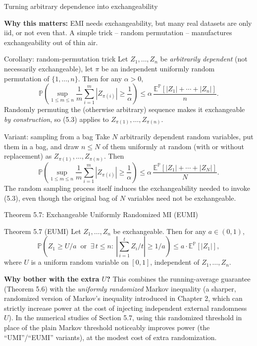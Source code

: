 \documentclass[aspectratio=169,10pt]{beamer}
\renewcommand{\P}{\mathbb{P}}
\newcommand{\E}{\mathbb{E}}
\begin{document}
\begin{frame}[allowframebreaks]{Turning arbitrary dependence into exchangeability}

  \textbf{Why this matters:} EMI needs exchangeability, but many
  real datasets are only iid, or not even that. A simple trick --
  random permutation -- manufactures exchangeability out of thin air.

  \begin{block}{Corollary: random-permutation trick}
    Let $Z_1,\ldots,Z_n$ be \emph{arbitrarily dependent} (not
    necessarily exchangeable), let $\pi$ be an independent uniformly
    random permutation of $\{1,\ldots,n\}$. Then for any $\alpha>0$,
    $$ \P\left(\sup_{1\le m\le n} \frac1m \sum_{i=1}^m |Z_{\pi(i)}| \ge \frac1\alpha\right)
       \le \alpha\, \frac{\E^\P[|Z_1|+\cdots+|Z_n|]}{n}. $$
    Randomly permuting the (otherwise arbitrary) sequence makes it
    exchangeable \emph{by construction}, so (5.3) applies to
    $Z_{\pi(1)},\ldots,Z_{\pi(n)}$.
  \end{block}

  \begin{block}{Variant: sampling from a bag}
    Take $N$ arbitrarily dependent random variables, put them in a
    bag, and draw $n \le N$ of them uniformly at random (with or
    without replacement) as $Z_{\pi(1)}, \ldots, Z_{\pi(n)}$. Then
    $$ \P\left(\sup_{1\le m\le n} \frac1m \sum_{i=1}^m |Z_{\pi(i)}| \ge \frac1\alpha\right)
       \le \alpha\, \frac{\E^\P[|Z_1|+\cdots+|Z_N|]}{N}. $$
    The random sampling process itself induces the exchangeability
    needed to invoke (5.3), even though the original bag of $N$
    variables need not be exchangeable.
  \end{block}

\end{frame}

\begin{frame}{Theorem 5.7: Exchangeable Uniformly Randomized MI (EUMI)}

  \begin{alertblock}{Theorem 5.7 (EUMI)}
    Let $Z_1,\ldots,Z_n$ be exchangeable. Then for any $a \in (0,1)$,
    $$ \P\left(Z_1 \ge U/a \ \text{ or }\ \exists\, t\le n:\ \left|\sum_{i=1}^t Z_i / t\right| \ge 1/a\right)
       \le a \cdot \E^\P[|Z_1|], $$
    where $U$ is a uniform random variable on $[0,1]$, independent of
    $Z_1,\ldots,Z_n$.
  \end{alertblock}

  \textbf{Why bother with the extra $U$?} This combines the running-average
  guarantee (Theorem 5.6) with the \emph{uniformly randomized} Markov
  inequality (a sharper, randomized version of Markov's inequality
  introduced in Chapter 2, which can strictly increase power at the
  cost of injecting independent external randomness $U$). In the
  numerical studies of Section 5.7, using this randomized threshold in
  place of the plain Markov threshold noticeably improves power (the
  ``UMI''/``EUMI'' variants), at the modest cost of extra
  randomization.

\end{frame}
\end{document}
